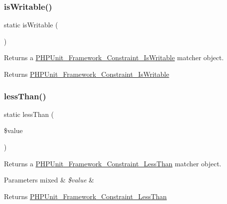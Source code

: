 \subsubsection{\texorpdfstring{is\+Writable()}{isWritable()}}
{\footnotesize\ttfamily static is\+Writable (\begin{DoxyParamCaption}{ }\end{DoxyParamCaption})\hspace{0.3cm}{\ttfamily [static]}}

Returns a \mbox{\hyperlink{class_p_h_p_unit___framework___constraint___is_writable}{P\+H\+P\+Unit\+\_\+\+Framework\+\_\+\+Constraint\+\_\+\+Is\+Writable}} matcher object.

\begin{DoxyReturn}{Returns}
\mbox{\hyperlink{class_p_h_p_unit___framework___constraint___is_writable}{P\+H\+P\+Unit\+\_\+\+Framework\+\_\+\+Constraint\+\_\+\+Is\+Writable}} 
\end{DoxyReturn}
\mbox{\label{class_p_h_p_unit___framework___assert_af2371ae4b76e8bae3ad0b738b0a7a516}} 
\subsubsection{\texorpdfstring{less\+Than()}{lessThan()}}
{\footnotesize\ttfamily static less\+Than (\begin{DoxyParamCaption}\item[{}]{\$value }\end{DoxyParamCaption})\hspace{0.3cm}{\ttfamily [static]}}

Returns a \mbox{\hyperlink{class_p_h_p_unit___framework___constraint___less_than}{P\+H\+P\+Unit\+\_\+\+Framework\+\_\+\+Constraint\+\_\+\+Less\+Than}} matcher object.


\begin{DoxyParams}[1]{Parameters}
mixed & {\em \$value} & \\
\hline
\end{DoxyParams}
\begin{DoxyReturn}{Returns}
\mbox{\hyperlink{class_p_h_p_unit___framework___constraint___less_than}{P\+H\+P\+Unit\+\_\+\+Framework\+\_\+\+Constraint\+\_\+\+Less\+Than}} 
\end{DoxyReturn}
\mbox{\label{class_p_h_p_unit___framework___assert_aec42c139b4e6ed79ab6b3ce3cd4d8290}} 
